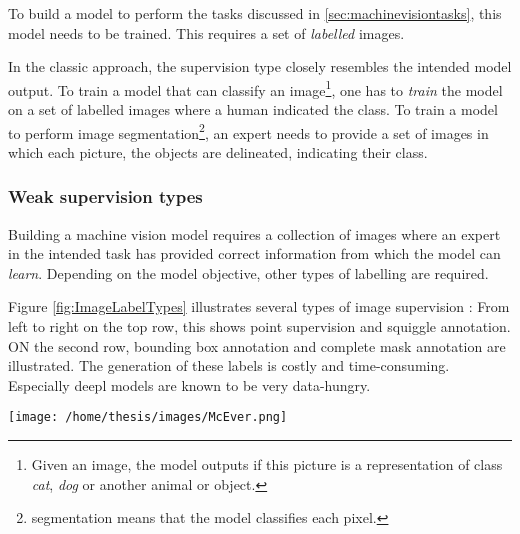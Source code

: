 To build a model to perform the tasks discussed in \ref{sec:machinevisiontasks}, this model needs to be trained.
This requires a set of \textit{labelled} images. 

In the classic approach, the supervision type closely resembles the intended model output.
To train a model that can classify an image\footnote{Given an image, the model outputs if this picture is a representation of class \textit{cat}, \textit{dog} or another animal or object. }, 
one has to \textit{train} the model on a set of labelled images where a human indicated the class.
To train a model to perform image segmentation\footnote{segmentation means that the model classifies each pixel.}, an expert needs to provide a set of images in which
each picture, the objects are delineated, indicating their class.  



\subsubsection{Weak supervision types}


Building a machine vision model requires a collection of images where an expert in the intended task has provided correct information from which the model can \textit{learn}.
Depending on the model objective, other types of labelling are required.


Figure \ref{fig:ImageLabelTypes} illustrates several types of image supervision : 
From left to right on the top row, this shows point supervision and squiggle annotation. ON the second row, bounding box annotation and complete mask annotation are illustrated.
The generation of these labels is costly and time-consuming.
Especially \gls{deepl} models are known to be very data-hungry. 

\begin{SCfigure}[][htb]
    \centering
    \texttt{[image: /home/thesis/images/McEver.png]}
    \caption{Four different annotation types \cite{McEver2020}: 
    On the top left the picture is point level annotated. The points are inflated for visibility.
    On the top right, squiggle annotation is used.
    The bottom left shows bounding box supervion.
    While the bottom right image is fully annotated.
    An image level label would indicate that there are multiple instances of \textit{person} and \textit{bike} in the image.
    \label{fig:ImageLabelTypes}}
\end{SCfigure}

